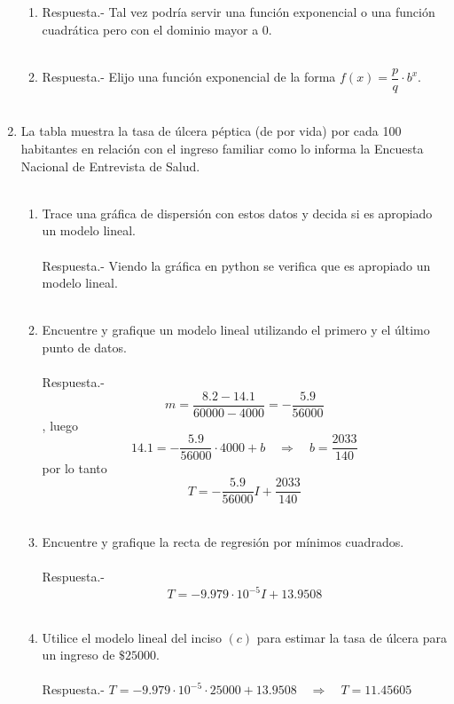 \begin{enumerate}
\begin{enumerate}[\bfseries (a)]
	\item Respuesta.-\; Tal vez podría servir una función exponencial o una función cuadrática pero con el dominio mayor a $0$.\\\\

	\item Respuesta.-\; Elijo una función exponencial de la forma $f(x)=\dfrac{p}{q} \cdot b^x$.\\\\

    \end{enumerate}

    \item La tabla muestra la tasa de úlcera péptica (de por vida) por cada 100 habitantes en relación con el ingreso familiar como lo informa la Encuesta Nacional de Entrevista de Salud.\\\\
    \begin{enumerate}[\bfseries (a)]

	\item Trace una gráfica de dispersión con estos datos y decida si es apropiado un modelo lineal.\\\\
	    Respuesta.-\; Viendo la gráfica en python se verifica que es apropiado un modelo lineal.\\\\

	\item Encuentre y grafique un modelo lineal utilizando el primero y el último punto de datos.\\\\
	    Respuesta.-\; $$m=\dfrac{8.2 - 14.1}{60000-4000} = -\dfrac{5.9}{56000}$$, luego $$14.1 =-\dfrac{5.9}{56000}\cdot 4000 + b \quad \Rightarrow \quad b = \dfrac{2033}{140}$$ por lo tanto $$T = -\dfrac{5.9}{56000}I + \dfrac{2033}{140}$$\\

	\item Encuentre y grafique la recta de regresión por mínimos cuadrados.\\\\
	    Respuesta.-\; $$T = -9.979\cdot 10^{-5} I + 13.9508$$\\

	\item Utilice el modelo lineal del inciso $(c)$ para estimar la tasa de úlcera para un ingreso de $ \$ 25000$.\\\\
	    Respuesta.-\; $T=-9.979\cdot 10^{-5} \cdot 25000 + 13.9508 \quad \Rightarrow \quad T=11.45605$\\\\ 


\end{enumerate}
\end{enumerate}
